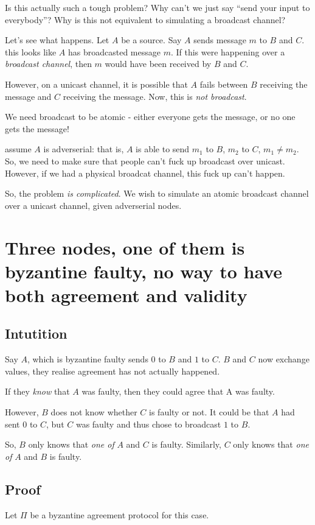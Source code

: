 \documentclass[11pt]{article}
\begin{document}
\begin{itemize}
  Is this actually such a tough problem? Why can't we just say ``send your input to everybody''? Why is this not equivalent to simulating
  a broadcast channel?


  Let's see what happens. Let $A$ be a source. Say $A$ sends message $m$ to $B$ and $C$. this looks like $A$ has broadcasted message $m$.
  If this were happening over a \textit{broadcast channel}, then $m$ would have been received by $B$ and $C$.

  However, on a unicast channel, it is possible that $A$ fails between $B$ receiving the message and $C$ receiving the message.
  Now, this is \textit{not broadcast}.

  We need broadcast to be atomic - either everyone gets the message, or no one gets the message!

  assume $A$ is adverserial: that is, $A$ is able to send $m_1$ to $B$, $m_2$ to $C$, $m_1 \neq m_2$. So, we need to make sure
  that people can't fuck up broadcast over unicast. However, if we had a physical broadcat channel, this fuck up can't happen.


  So, the problem \textit{is complicated}. We wish to simulate an atomic broadcast channel over a unicast channel, given
  adverserial nodes.
\end{itemize}

\section{Three nodes, one of them is byzantine faulty, no way to have both agreement and validity}
\subsection{Intutition}
Say $A$, which is byzantine faulty sends $0$ to $B$ and $1$ to $C$. $B$ and $C$ now exchange values,
they realise agreement has not actually happened.

If they \textit{know} that $A$ was faulty, then they could agree that A was faulty.

However, $B$ does not know whether $C$ is faulty or not. It could be that $A$ had sent
$0$ to $C$, but $C$ was faulty and thus chose to broadcast $1$ to $B$.

So, $B$ only knows that \textit{one of} $A$ and $C$ is faulty.
Similarly, $C$ only knows that \textit{one of} $A$ and $B$ is faulty.

\subsection{Proof}
Let $\Pi$ be a byzantine agreement protocol for this case.
\end{document}
